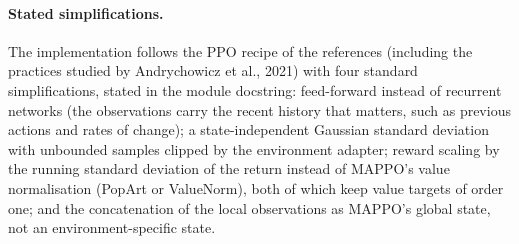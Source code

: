 \paragraph{Stated simplifications.} The implementation follows the PPO recipe
of the references (including the practices studied by Andrychowicz et al.,
2021) with four standard simplifications, stated in the module docstring:
feed-forward instead of recurrent networks (the  observations
carry the recent history that matters, such as previous actions and rates of
change); a state-independent Gaussian standard deviation with unbounded
samples clipped by the environment adapter; reward scaling by the running
standard deviation of the return instead of MAPPO's value normalisation
(PopArt or ValueNorm), both of which keep value targets of order one; and the
concatenation of the local observations as MAPPO's global state, not an
environment-specific state.

